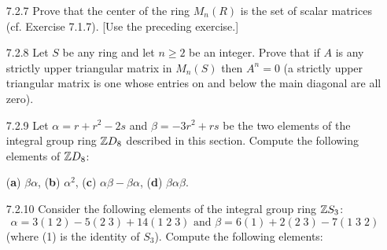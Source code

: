 \begin{enumerate}
   \item[7.2.7]   Prove that the center of the ring $M_n(R)$ is the set of
                  scalar matrices (cf. Exercise 7.1.7). [Use the preceding
                  exercise.]
   \item[7.2.8]   Let $S$ be any ring and let $n \ge 2$ be an integer. Prove
                  that if $A$ is any strictly upper triangular matrix in
                  $M_n(S)$ then $A^n = 0$ (a strictly upper triangular matrix is
                  one whose entries on and below the main diagonal are all
                  zero).
   \item[7.2.9]   Let $\alpha = r + r^2 - 2s$ and $\beta = -3r^2 + rs$ be the
                  two elements of the integral group ring $\mathbb{Z} D_8$ described in
                  this section. Compute the following elements of $\mathbb{Z} D_8$:
                  
                  (\textbf{a}) $\beta\alpha$, \quad (\textbf{b}) $\alpha^2$,
                  \quad (\textbf{c}) $\alpha\beta - \beta\alpha$, \quad
                  (\textbf{d}) $\beta\alpha\beta$.
   \item[7.2.10]  Consider the following elements of the integral group ring
                  $\mathbb{Z} S_3$:
                  $$\alpha = 3(1\;2) - 5(2\;3) + 14(1\;2\;3) \text{ and }
                    \beta = 6(1) + 2(2\;3) - 7(1\;3\;2)$$
                  (where (1) is the identity of $S_3$). Compute the following
                  elements:
            

\end{enumerate}
